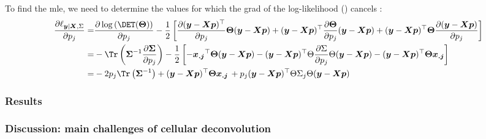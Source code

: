 To find the \gls{mle}, we need to determine the values for which the \gls{grad} of the log-likelihood () cancels : 
\begin{equation}
\label{eq:derivative-log-likelihood-reference}
\begin{split}
\frac{\partial \ell_{\boldsymbol{y} | \boldsymbol{X}, \Sigma}}{\partial p_j} =& \frac{\partial \log\left(\DET(\boldsymbol{\Theta})\right)}{\partial p_j} -\frac{1}{2} \left[\frac{\partial (\boldsymbol{y} - \boldsymbol{X} \boldsymbol{p})^\top}{\partial p_j}\boldsymbol{\Theta}(\boldsymbol{y} - \boldsymbol{X} \boldsymbol{p}) + (\boldsymbol{y} - \boldsymbol{X} \boldsymbol{p})^\top\frac{\partial\boldsymbol{\Theta}}{\partial p_j}(\boldsymbol{y} - \boldsymbol{X} \boldsymbol{p}) + (\boldsymbol{y} - \boldsymbol{X} \boldsymbol{p})^\top\boldsymbol{\Theta} \frac{\partial (\boldsymbol{y} - \boldsymbol{X} \boldsymbol{p})}{\partial p_j} \right]\\
=&-\Tr \left(\boldsymbol{\Sigma}^{-1} \frac{\partial \boldsymbol{\Sigma}}{\partial p_j} \right) - \frac{1}{2} \left[ - \boldsymbol{x_{.j}}^\top\boldsymbol{\Theta}(\boldsymbol{y} - \boldsymbol{X} \boldsymbol{p}) - (\boldsymbol{y} - \boldsymbol{X} \boldsymbol{p})^\top\Theta\frac{\partial \Sigma}{\partial p_j}\Theta(\boldsymbol{y} - \boldsymbol{X} \boldsymbol{p}) - (\boldsymbol{y} - \boldsymbol{X} \boldsymbol{p})^\top\boldsymbol{\Theta}  \boldsymbol{x_{.j}} \right] \\
=& -2p_j \Tr \left(\boldsymbol{\Sigma}^{-1}\right) + (\boldsymbol{y} - \boldsymbol{X} \boldsymbol{p})^\top\boldsymbol{\Theta}  \boldsymbol{x_{.j}} \, + p_j (\boldsymbol{y} - \boldsymbol{X} \boldsymbol{p})^\top\Theta \Sigma_j \Theta (\boldsymbol{y} - \boldsymbol{X} \boldsymbol{p})
\end{split}
\end{equation}



\subsubsection{Results}

\subsubsection{Discussion: main challenges of cellular deconvolution}

